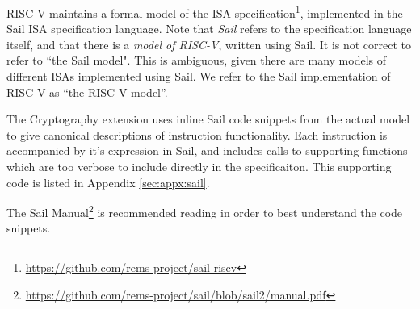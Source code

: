 
RISC-V maintains a formal model of the ISA specification\footnote{\url{https://github.com/rems-project/sail-riscv}}, implemented
in the Sail ISA specification language\cite{sail}.
Note that {\em Sail} refers to the specification language itself,
and that there is a {\em model of RISC-V}, written using Sail.
It is not correct to refer to ``the Sail model".
This is ambiguous, given there are many models of different ISAs implemented
using Sail. We refer to the Sail implementation of RISC-V as
``the RISC-V model''.

The Cryptography extension uses inline Sail code snippets from the
actual model to give canonical descriptions of instruction
functionality.
Each instruction is accompanied by it's expression in Sail, and includes
calls to supporting functions which are too verbose to include directly
in the specificaiton.
This supporting code is listed in Appendix \ref{sec:appx:sail}.

The Sail Manual\footnote{\url{https://github.com/rems-project/sail/blob/sail2/manual.pdf}} is recommended reading in order to
best understand the code snippets.
